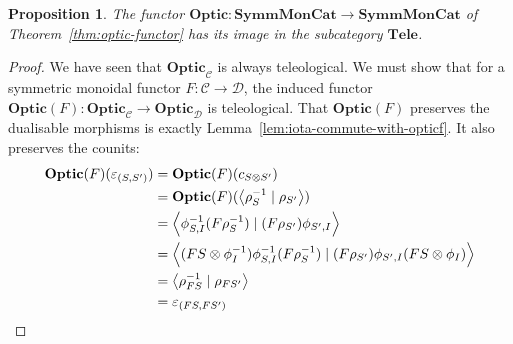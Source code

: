 \documentclass[11pt,letterpaper]{article}
\theoremstyle{plain}
\newtheorem{proposition}[theorem]{Proposition}
\theoremstyle{definition}
\newcommand{\C}{\mathscr{C}}
\newcommand{\D}{\mathscr{D}}
\newcommand{\SymmMonCat}{\mathbf{SymmMonCat}}
\newcommand{\Tele}{\mathbf{Tele}}
\newcommand{\Optic}{\mathbf{Optic}}
\newcommand{\rep}[2]{{\ensuremath \left\langle #1 \mid #2 \right\rangle}}
\newcommand{\todo}[1]{\textcolor{red}{\small #1}}
\begin{document}

\begin{proposition}
  The functor $\Optic : \SymmMonCat \to \SymmMonCat$ of Theorem~\ref{thm:optic-functor} has its image in the subcategory $\Tele$.
\end{proposition}
\begin{proof}
 We have seen that $\Optic_\C$ is always teleological. We must show that for a symmetric monoidal functor $F : \C \to \D$, the induced functor $\Optic(F) : \Optic_\C \to \Optic_\D$ is teleological. That $\Optic(F)$ preserves the dualisable morphisms is exactly Lemma~\ref{lem:iota-commute-with-opticf}. It also preserves the counits:
  \begin{align*}
    \Optic(F)(\varepsilon_{(S, S')})
    &= \Optic(F)(c_{S \otimes S'}) \\
    &= \Optic(F)(\rep{\rho_S^{-1}}{\rho_{S'}}) \\
    &= \rep{\phi^{-1}_{S,I} (F \rho_S^{-1})}{(F \rho_{S'}) \phi_{S',I}} \\
    &= \rep{(FS \otimes \phi_I^{-1}) \phi^{-1}_{S,I} (F \rho_S^{-1})}{(F \rho_{S'}) \phi_{S',I} (FS \otimes \phi_I)} \\
    &= \rep{\rho_{FS}^{-1}}{\rho_{FS'}} \\
    &= \varepsilon_{(FS, FS')}
  \end{align*}

\end{proof}
\end{document}
